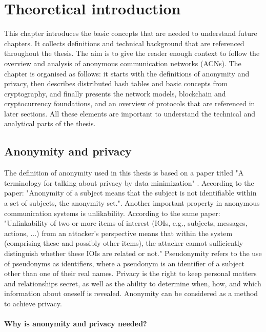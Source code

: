 \chapter{Theoretical introduction}
\label{chap:Theory}

This chapter introduces the basic concepts that are needed to understand future chapters. It collects definitions and technical background that are referenced throughout the thesis. The aim is to give the reader enough context to follow the overview and analysis of anonymous communication networks (ACNs). The chapter is organised as follows: it starts with the definitions of anonymity and privacy, then describes distributed hash tables and basic concepts from cryptography, and finally presents the network models, blockchain and cryptocurrency foundations, and an overview of protocols that are referenced in later sections. All these elements are important to understand the technical and analytical parts of the thesis.

\section{Anonymity and privacy}
The definition of anonymity used in this thesis is based on a paper titled "A terminology for talking about privacy by data minimization" \cite{anon-terminology}.
According to the paper: "Anonymity of a subject means that the subject is not identifiable within a set of subjects, the anonymity set.". Another important property in anonymous communication systems is unlikability. According to the same paper: "Unlinkability of two or more items of interest (IOIs, e.g., subjects, messages, actions, ...) from an attacker’s perspective means that within the system (comprising these and possibly other items), the attacker cannot sufficiently distinguish whether these IOIs are related or not."
Pseudonymity refers to the use of pseudonyms as identifiers, where a pseudonym is an identifier of a subject other than one of their real names.
Privacy is the right to keep personal matters and relationships secret, as well as the ability to determine when, how, and which information about oneself is revealed.
Anonymity can be considered as a method to achieve privacy.

\subsubsection{Why is anonymity and privacy needed?}

